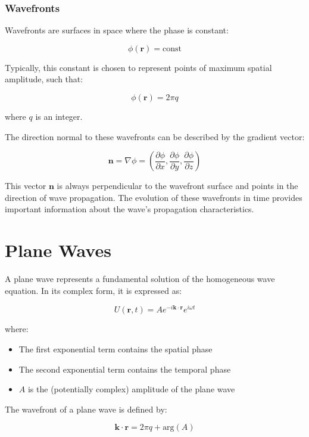 \documentclass[
  a4paper,
]{book}
\providecommand{\tightlist}{%
  \setlength{\itemsep}{0pt}\setlength{\parskip}{0pt}}
\begin{document}
\subsubsection{Wavefronts}\label{wavefronts}

Wavefronts are surfaces in space where the phase is constant:

\[
\phi(\mathbf{r})=\text{const}
\]

Typically, this constant is chosen to represent points of maximum
spatial amplitude, such that:

\[
\phi(\mathbf{r})=2\pi q
\]

where \(q\) is an integer.

The direction normal to these wavefronts can be described by the
gradient vector:

\[
\mathbf{n}=\nabla\phi=\left(\frac{\partial \phi}{\partial x},\frac{\partial \phi}{\partial y},\frac{\partial \phi}{\partial z}\right)
\]

This vector \(\mathbf{n}\) is always perpendicular to the wavefront
surface and points in the direction of wave propagation. The evolution
of these wavefronts in time provides important information about the
wave's propagation characteristics.

\section{Plane Waves}\label{plane-waves}

A plane wave represents a fundamental solution of the homogeneous wave
equation. In its complex form, it is expressed as:

\begin{equation}
U(\mathbf{r},t)=Ae^{-i\mathbf{k}\cdot \mathbf{r}}e^{i\omega t}
\end{equation}

where:

\begin{itemize}
\tightlist
\item
  The first exponential term contains the spatial phase
\item
  The second exponential term contains the temporal phase
\item
  \(A\) is the (potentially complex) amplitude of the plane wave
\end{itemize}

The wavefront of a plane wave is defined by:

\[\mathbf{k}\cdot \mathbf{r}=2\pi q + \text{arg}(A)\]
\end{document}
